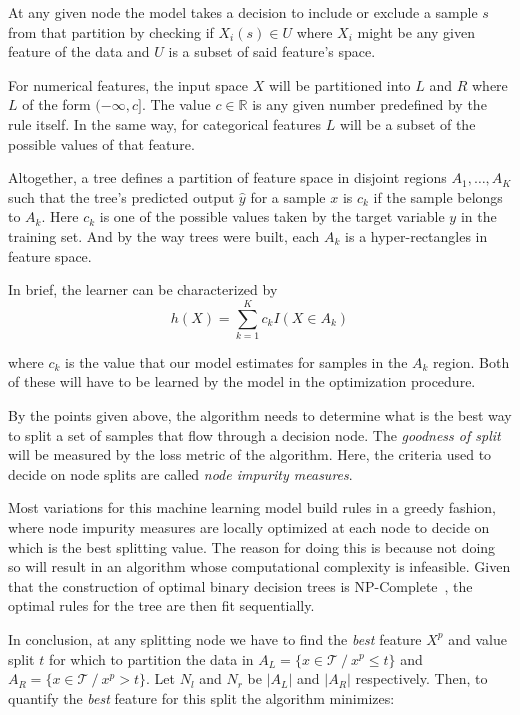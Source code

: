 At any given node the model takes a decision to include or exclude a sample $s$ from that partition by checking if $X_i(s) \in U$ where $X_i$ might be any given feature of the data and $U$ is a subset of said feature's space.

For numerical features, the input space $X$ will be partitioned into $L$ and $R$ where $L$ of the form $(-\infty,c]$. The value $c \in \mathbb{R}$ is any given number predefined by the rule itself. In the same way, for categorical features $L$ will be a subset of the possible values of that feature.

Altogether, a tree defines a partition of feature space in disjoint regions $A_1,\ldots,A_K$ such that the tree's predicted output $\hat{y}$ for a sample $x$ is $c_k$ if the sample belongs to $A_k$. Here $c_k$ is one of the possible values taken by the target variable $y$ in the training set. And by the way trees were built, each $A_k$ is a hyper-rectangles in feature space.

In brief, the learner can be characterized by
\begin{equation}
h(X) = \sum_{k=1}^K c_k I(X \in A_k)
\end{equation}\label{eq:decisionTreeModel}

where $c_k$ is the value that our model estimates for samples in the $A_k$ region. Both of these will have to be learned by the model in the optimization procedure. %

By the points given above, the algorithm needs to determine what is the best way to split a set of samples that flow through a decision node. The \textit{goodness of split} will be measured by the loss metric of the algorithm. Here, the criteria used to decide on node splits are called \textit{node impurity measures}.

Most variations for this machine learning model build rules in a greedy fashion, where node impurity measures are locally optimized at each node to decide on which is the best splitting value. The reason for doing this is because not doing so will result in an algorithm whose computational complexity is infeasible. Given that the construction of optimal binary decision trees is NP-Complete~\textcite{decisionTreesNP}, the optimal rules for the tree are then fit sequentially.

In conclusion, at any splitting node we have to find the \textit{best} feature $X^p$ and value split $t$ for which to partition the data in
$A_L = \{x \in \mathcal{T} \ / \ x^p \leq t \} $ and $A_R = \{x \in \mathcal{T}\ / \ x^p> t \} $. Let $N_l$ and $N_r$ be $|A_L|$ and $|A_R|$ respectively. Then, to quantify the \textit{best} feature for this split the algorithm minimizes:

